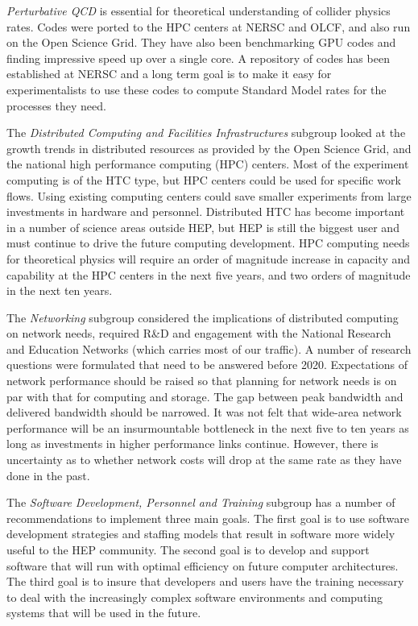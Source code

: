 {\it Perturbative QCD} is essential for theoretical understanding of
collider physics rates. Codes were ported to the HPC centers at NERSC and
OLCF, and also run on the Open Science Grid. They have also been
benchmarking GPU codes and finding impressive speed up over a single core.
A repository of codes has been established at NERSC and a long term goal is
to make it easy for experimentalists to use these codes to compute Standard
Model rates for the processes they need.

The {\it Distributed Computing and Facilities Infrastructures} subgroup
looked at the growth trends in distributed resources as provided by the
Open Science Grid, and the national high performance computing (HPC)
centers. Most of the experiment computing is of the HTC type, but HPC
centers could be used for specific work flows. Using existing computing
centers could save smaller experiments from large investments in hardware
and personnel. Distributed HTC has become important in a number of science
areas outside HEP, but HEP is still the biggest user and must continue to
drive the future computing development. HPC computing needs for theoretical
physics will require an order of magnitude increase in capacity and
capability at the HPC centers in the next five years, and two orders of
magnitude in the next ten years.

The {\it Networking} subgroup considered the implications of distributed
computing on network needs, required R\&D and engagement with the National
Research and Education Networks (which carries most of our traffic). A
number of research questions were formulated that need to be answered
before 2020. Expectations of network performance should be raised so that
planning for network needs is on par with that for computing and storage.
The gap between peak bandwidth and delivered bandwidth should be narrowed.
It was not felt that wide-area network performance will be an
insurmountable bottleneck in the next five to ten years as long as
investments in higher performance links continue. However, there is
uncertainty as to whether network costs will drop at the same rate as they
have done in the past.

The {\it Software Development, Personnel and Training} subgroup has a
number of recommendations to implement three main goals. The first goal is
to use software development strategies and staffing models that result in
software more widely useful to the HEP community. The second goal is to
develop and support software that will run with optimal efficiency on
future computer architectures. The third goal is to insure that developers
and users have the training necessary to deal with the increasingly complex
software environments and computing systems that will be used in the future.

